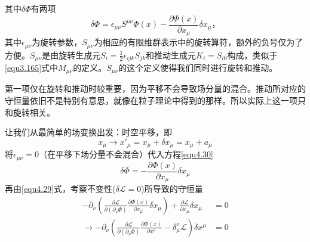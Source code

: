 其中$\delta\Phi$有两项
\begin{equation}
\delta\Phi = \epsilon_{\mu\nu}S^{\mu\nu}\Phi(x)-\frac{\partial\Phi(x)}{\partial x_\mu}\delta x_\mu \text{，}
\label{equ4.30}
\end{equation}
其中$\epsilon_{\mu\nu}$为旋转参数，$S_{\mu\nu}$为相应的有限维群表示中的旋转算符，额外的负号仅为了方便。$S_{\mu\nu}$是由旋转生成元$S_{i}=\frac{1}{2}\epsilon_{ijk}S_{jk}$和推动生成元$K_i=S_{i0}$构成，类似于\eqref{equ3.165}式中$M_{\mu\nu}$的定义。$S_{\mu\nu}$的这个定义使得我们同时进行旋转和推动。

第一项仅在旋转和推动时较重要，因为平移不会导致场分量的混合。推动所对应的守恒量依旧不是特别有意思，就像在粒子理论中得到的那样。所以实际上这一项只和旋转相关。

让我们从最简单的场变换出发：时空平移，即
\begin{equation}
x_\mu \rightarrow x'_\mu = x_\mu + \delta x_\mu = x_\mu + a_\mu
\label{equ4.31}
\end{equation}
将$\epsilon_{\mu\nu}=0$（在平移下场分量不会混合）代入方程\eqref{equ4.30}
\[
\delta\Phi = -\frac{\partial\Phi(x)}{\partial x_\mu}\delta x_\mu
\]
再由\eqref{equ4.29}式，考察不变性($\delta{\mathscr L}=0$)所导致的守恒量
\begin{eqnarray}
-\partial_\nu\left(\frac{\partial\mathscr L}{\partial(\partial_\nu \Phi)}\frac{\partial\Phi(x)}{\partial x_\mu}\delta x_\mu\right) + \frac{\partial\mathscr L}{\partial x_\mu}\delta x_\mu &= 0 \\
\rightarrow -\partial_\nu\left(\frac{\partial\mathscr L}{\partial(\partial_\nu \Phi)}\frac{\partial\Phi(x)}{\partial x^\mu} - \delta_\mu^\nu{\mathscr L}\right) \delta x^\mu &= 0 \label{equ4.33}
\end{eqnarray}

